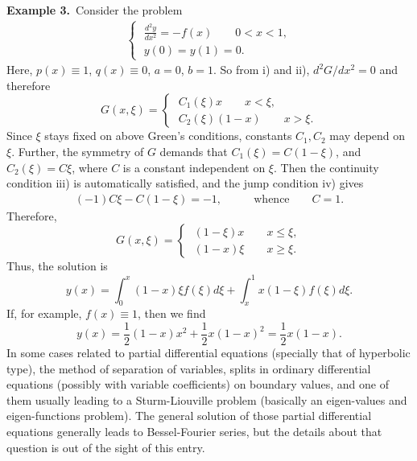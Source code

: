 \documentclass[12pt]{article}
\theoremstyle{definition}
\begin{document}
\textbf{Example 3.}\, Consider the problem
\begin{align*}
\begin{cases}
\; \frac{d^2y}{dx^2}=-f(x) \qquad  0<x<1, \\
\; y(0)=y(1)=0.
\end{cases}
\end{align*}
Here, $p(x)\equiv 1$, $q(x)\equiv 0$, $a=0$, $b=1$. So from i) and ii), $d^2G/dx^2=0$ and therefore
$$G(x,\xi)=\begin{cases}
\; C_1(\xi)x\qquad x<\xi, \\
\; C_2(\xi)(1-x)\qquad x>\xi. \end{cases}$$
Since $\xi$ stays fixed on above Green's conditions, constants $C_1,C_2$ may depend on $\xi$. Further, the symmetry of $G$ demands that $C_1(\xi)=C(1-\xi)$, and $C_2(\xi)=C\xi$, where $C$ is a constant independent on $\xi$. Then the continuity condition iii) is automatically satisfied, and the jump condition iv) gives
\begin{align*}
(-1)C\xi-C(1-\xi)=-1,\qquad & \textrm{whence} \qquad C=1.
\end{align*}
Therefore,
$$G(x,\xi)=\begin{cases}
\; (1-\xi)x\qquad x\leq \xi, \\
\; (1-x)\xi\qquad x\geq \xi. \end{cases}$$
Thus, the solution is
$$y(x)=\int_0^x (1-x)\xi f(\xi)d\xi+\int_x^1 x(1-\xi)f(\xi)d\xi.$$
If, for example, $f(x)\equiv 1$, then we find
$$y(x)=\frac{1}{2}(1-x)x^2+\frac{1}{2}x(1-x)^2=\frac{1}{2}x(1-x).$$
In some cases related to partial differential equations (specially that of hyperbolic type), the method of separation of variables, splits in ordinary differential equations (possibly with variable coefficients) on boundary values, and one of them usually leading to a Sturm-Liouville problem (basically an eigen-values and eigen-functions problem). The general solution of those partial differential equations generally leads to Bessel-Fourier series, but the details about that question is out of the sight of this entry. 
 
   


\end{document}
